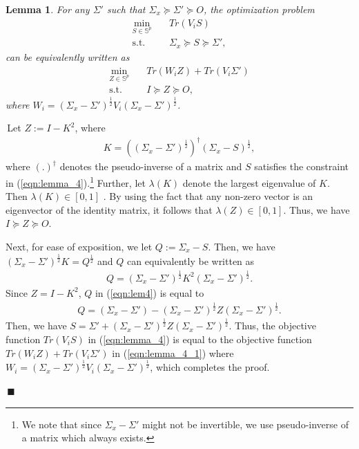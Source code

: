 \documentclass[12pt,journal,onecolumn]{IEEEtran}
\newtheorem{lemma}{Lemma}
\newenvironment{Proof}[1]{\medskip\par\noindent{\bf Proof:\,}\,#1}{{\mbox{\,$\blacksquare$}\par}}
\newcommand{\rknote}[1]{\noindent{\leavevmode\color{red}[Raj -- #1]}}
\begin{document}
\begin{lemma}\label{lem: transf}
For any $\Sigma'$ such that $\Sigma_x\succeq\Sigma'\succeq O$, the optimization problem
\begin{align}\label{eqn:lemma_4}
\min_{S\in\mathbb{S}^p} & \quad Tr(V_iS) \nonumber\\
\textrm{s.t.} & \quad 
\Sigma_x\succeq S\succeq\Sigma',
\end{align}
can be equivalently written as
\begin{align}\label{eqn:lemma_4_1}
\min_{Z\in\mathbb{S}^p} & \quad Tr(W_iZ)+ Tr(V_i\Sigma') \nonumber\\
\textrm{s.t.} & \quad 
I\succeq Z\succeq O,
\end{align}
where $W_i=(\Sigma_x-\Sigma')^{\frac{1}{2}}V_i(\Sigma_x-\Sigma')^{\frac{1}{2}}$.
\end{lemma}
\begin{Proof}
Let $Z:=I-K^2$, where
\begin{align}
    K=\left((\Sigma_x-\Sigma')^{\frac{1}{2}}\right)^{\dagger}(\Sigma_x-S)^{\frac{1}{2}}, 
\end{align}
where $(.)^{\dagger}$ denotes the pseudo-inverse of a matrix and $S$ satisfies the constraint in (\ref{eqn:lemma_4}).\footnote{We note that since $\Sigma_x-\Sigma'$ might not be invertible, we use pseudo-inverse of a matrix which always exists.} Further, let $\lambda(K)$ %
denote the largest eigenvalue of $K$. %
Then $\lambda(K)\in[0,1]$ \cite{gross2001lowner}. By using the fact that any non-zero vector is an eigenvector of the identity matrix, it follows that $\lambda(Z)\in [0,1]$. Thus, we have $ I\succeq Z\succeq O$. 

Next, for ease of exposition, we let $ Q := \Sigma_x-S$. Then, we have $(\Sigma_x-\Sigma')^{\frac{1}{2}}K=Q^{\frac{1}{2}}$ and $Q$ can equivalently be written as 
\begin{align}\label{eqn:lem4}
 Q=(\Sigma_x-\Sigma')^{\frac{1}{2}}K^2(\Sigma_x-\Sigma')^{\frac{1}{2}}.
\end{align}
Since $Z=I-K^2$, $Q$ in (\ref{eqn:lem4}) is equal to %
\begin{align}\label{eqn:lem5}
Q=(\Sigma_x-\Sigma')-(\Sigma_x-\Sigma')^{\frac{1}{2}}Z(\Sigma_x-\Sigma')^{\frac{1}{2}}.
\end{align}
Then, we have $S=\Sigma'+(\Sigma_x-\Sigma')^{\frac{1}{2}}Z(\Sigma_x-\Sigma')^{\frac{1}{2}}$. Thus, the objective function $Tr(V_iS)$ in (\ref{eqn:lemma_4}) is equal to the objective function $Tr(W_iZ)+ Tr(V_i\Sigma')$ in (\ref{eqn:lemma_4_1}) where $W_i=(\Sigma_x-\Sigma')^{\frac{1}{2}}V_i(\Sigma_x-\Sigma')^{\frac{1}{2}}$, which completes the proof.
\end{Proof}
\end{document}
